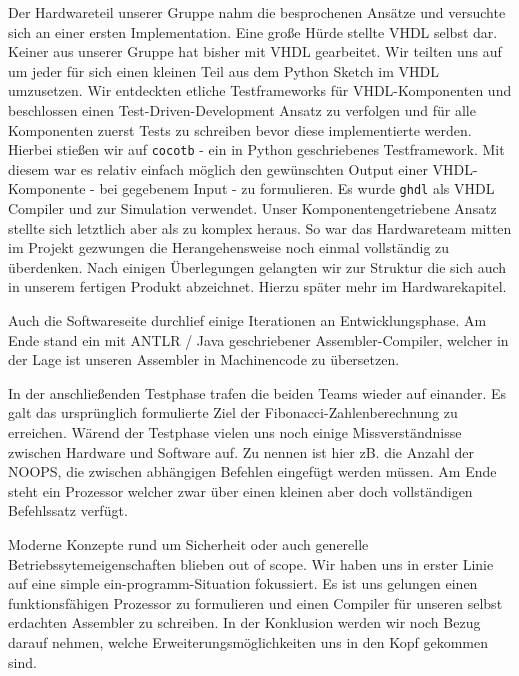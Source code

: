 \documentclass[paper=a4,fontsize=12pt,twocolumn]{scrreprt}
\begin{document}
Der Hardwareteil unserer Gruppe nahm die besprochenen Ansätze und versuchte sich an einer ersten Implementation.
Eine große Hürde stellte VHDL selbst dar.
Keiner aus unserer Gruppe hat bisher mit VHDL gearbeitet.
Wir teilten uns auf um jeder für sich einen kleinen Teil aus dem Python Sketch im VHDL umzusetzen.
Wir entdeckten etliche Testframeworks für VHDL-Komponenten und beschlossen einen Test-Driven-Development Ansatz zu verfolgen und für alle Komponenten zuerst Tests zu schreiben bevor diese implementierte werden.
Hierbei stießen wir auf \texttt{cocotb} - ein in Python geschriebenes Testframework. %
Mit diesem war es relativ einfach möglich den gewünschten Output einer VHDL-Komponente - bei gegebenem Input - zu formulieren.
Es wurde \texttt{ghdl} als VHDL Compiler und zur Simulation verwendet.
Unser Komponentengetriebene Ansatz stellte sich letztlich aber als zu komplex heraus.
So war das Hardwareteam mitten im Projekt gezwungen die Herangehensweise noch einmal vollständig zu überdenken.
Nach einigen Überlegungen gelangten wir zur Struktur die sich auch in unserem fertigen Produkt abzeichnet.
Hierzu später mehr im Hardwarekapitel.

Auch die Softwareseite durchlief einige Iterationen an Entwicklungsphase.
Am Ende stand ein mit ANTLR / Java geschriebener Assembler-Compiler, welcher in der Lage ist unseren Assembler in Machinencode zu übersetzen.

In der anschließenden Testphase trafen die beiden Teams wieder auf einander.
Es galt das ursprünglich formulierte Ziel der Fibonacci-Zahlenberechnung zu erreichen.
Wärend der Testphase vielen uns noch einige Missverständnisse zwischen Hardware und Software auf.
Zu nennen ist hier zB. die Anzahl der NOOPS, die zwischen abhängigen Befehlen eingefügt werden müssen. 
Am Ende steht ein Prozessor welcher zwar über einen kleinen aber doch vollständigen Befehlssatz verfügt.

Moderne Konzepte rund um Sicherheit oder auch generelle Betriebssytemeigenschaften blieben out of scope.
Wir haben uns in erster Linie auf eine simple ein-programm-Situation fokussiert.
Es ist uns gelungen einen funktionsfähigen Prozessor zu formulieren und einen Compiler für unseren selbst erdachten Assembler zu schreiben.
In der Konklusion werden wir noch Bezug darauf nehmen, welche Erweiterungsmöglichkeiten uns in den Kopf gekommen sind.
\end{document}
